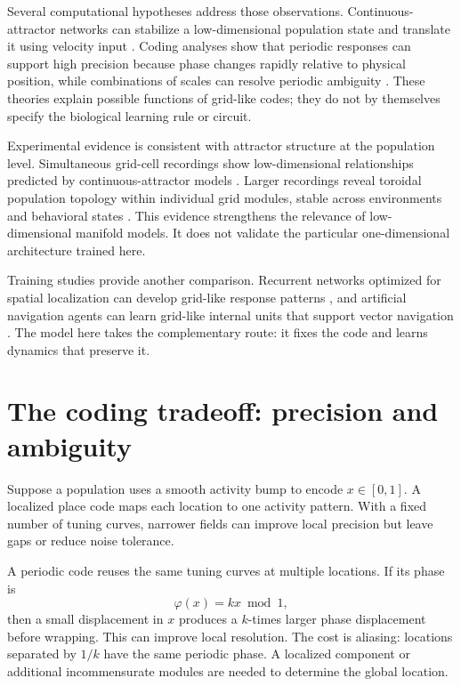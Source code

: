 Several computational hypotheses address those observations. Continuous-attractor networks can stabilize a low-dimensional population state and translate it using velocity input \citep{ss02,by09}. Coding analyses show that periodic responses can support high precision because phase changes rapidly relative to physical position, while combinations of scales can resolve periodic ambiguity \citep{ss11,wei15,stemmler15}. These theories explain possible functions of grid-like codes; they do not by themselves specify the biological learning rule or circuit.

Experimental evidence is consistent with attractor structure at the population level. Simultaneous grid-cell recordings show low-dimensional relationships predicted by continuous-attractor models \citep{yoon13}. Larger recordings reveal toroidal population topology within individual grid modules, stable across environments and behavioral states \citep{gardner22}. This evidence strengthens the relevance of low-dimensional manifold models. It does not validate the particular one-dimensional architecture trained here.

Training studies provide another comparison. Recurrent networks optimized for spatial localization can develop grid-like response patterns \citep{cueva18}, and artificial navigation agents can learn grid-like internal units that support vector navigation \citep{banino18}. The model here takes the complementary route: it fixes the code and learns dynamics that preserve it.

\section{The coding tradeoff: precision and ambiguity}
\label{sec:attractor-coding-tradeoff}

Suppose a population uses a smooth activity bump to encode $x\in[0,1]$. A localized place code maps each location to one activity pattern. With a fixed number of tuning curves, narrower fields can improve local precision but leave gaps or reduce noise tolerance.

A periodic code reuses the same tuning curves at multiple locations. If its phase is
\begin{equation}
\varphi(x)=kx\bmod 1,
\end{equation}
then a small displacement in $x$ produces a $k$-times larger phase displacement before wrapping. This can improve local resolution. The cost is aliasing: locations separated by $1/k$ have the same periodic phase. A localized component or additional incommensurate modules are needed to determine the global location.

